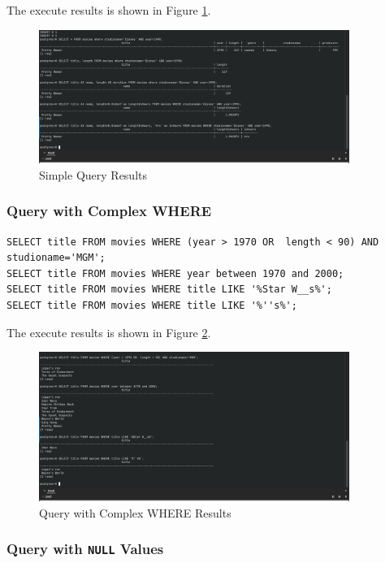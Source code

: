 \documentclass{cshwk}
\begin{document}
The execute results is shown in Figure \ref{fig:simple-query}.
\begin{figure}[htbp]
    \centering
    \includegraphics[width=0.9\textwidth]{hw4-3.png}
    \caption{Simple Query Results}
    \label{fig:simple-query}
\end{figure}

\subsubsection{Query with Complex WHERE}

\begin{lstlisting}
SELECT title FROM movies WHERE (year > 1970 OR  length < 90) AND studioname='MGM';
SELECT title FROM movies WHERE year between 1970 and 2000;
SELECT title FROM movies WHERE title LIKE '%Star W__s%';
SELECT title FROM movies WHERE title LIKE '%''s%';
\end{lstlisting}

The execute results is shown in Figure \ref{fig:complex-where}.
\begin{figure}[htbp]
    \centering
    \includegraphics[width=0.9\textwidth]{hw4-4.png}
    \caption{Query with Complex WHERE Results}
    \label{fig:complex-where}
\end{figure}

\subsubsection{Query with \texttt{NULL} Values}
\end{document}
